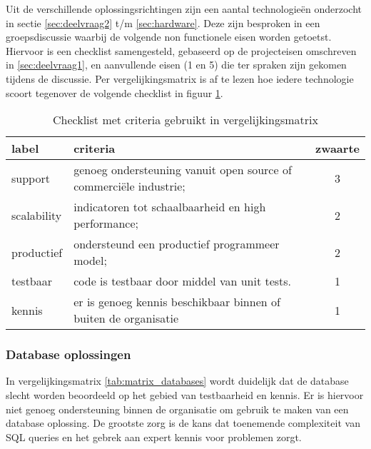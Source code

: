 Uit de verschillende oplossingsrichtingen zijn een aantal technologieën onderzocht in sectie \ref{sec:deelvraag2} t/m \ref{sec:hardware}. Deze zijn besproken in een groepsdiscussie waarbij de volgende non functionele eisen worden getoetst. Hiervoor is een checklist samengesteld, gebaseerd op de projecteisen omschreven in \ref{sec:deelvraag1}, en aanvullende eisen (1 en 5) die ter spraken zijn gekomen tijdens de discussie. Per vergelijkingsmatrix is af te lezen hoe iedere technologie scoort tegenover de volgende checklist in figuur \ref{tab:checklist}.

\begin{table}[h]
\centering
\caption{Checklist met criteria gebruikt in vergelijkingsmatrix}
\label{tab:checklist}
\def\arraystretch{1.2}
\begin{tabular}{l|p{11cm}c}
label       & criteria                                                          & zwaarte \\ \hline
support     & genoeg ondersteuning vanuit open source of commerciële industrie; & 3       \\
scalability & indicatoren tot schaalbaarheid en high performance;               & 2       \\
productief  & ondersteund een productief programmeer model;                     & 2       \\
testbaar    & code is testbaar door middel van unit tests.                      & 1       \\
kennis      & er is genoeg kennis beschikbaar binnen of buiten de organisatie   & 1      
\end{tabular}
\end{table}

\subsubsection{\textbf{Database oplossingen}}

In vergelijkingsmatrix \ref{tab:matrix_databases} wordt duidelijk dat de database slecht worden beoordeeld op het gebied van testbaarheid en kennis. Er is hiervoor niet genoeg ondersteuning binnen de organisatie om gebruik te maken van een database oplossing. De grootste zorg is de kans dat toenemende complexiteit van SQL queries en het gebrek aan expert kennis voor problemen zorgt.


